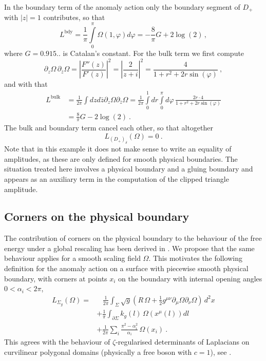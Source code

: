 \documentclass[11pt,a4paper]{article}
\numberwithin{equation}{section}
\begin{document}
In the boundary term of the anomaly action only the boundary segment of $D_+$ with $|z| = 1$ contributes, so that 
%
\begin{equation}
    L^\text{bdy} = \frac{1}{\pi}\int\limits_0^\pi \Omega(1,\varphi) d\varphi
    = 
    -\frac8\pi G + 2\log(2)\,,
\end{equation}
%
where $G=0.915..$ is Catalan's constant. 
For the bulk term we first compute
\begin{equation}
\partial_z \Omega\, \partial_{\bar z} \Omega
= \left| \frac{F''(z)}{F'(z)} \right|^2
= \left| \frac{2}{z+i} \right|^2=\frac{4}{1+r^2+2r\sin(\varphi)} \ ,
\end{equation}
and with that
\begin{align}
L^\text{bulk} &= \frac{1}{2\pi}
    \int dzd\bar{z} \partial_z \Omega \partial_{\bar z} \Omega = \frac{1}{2\pi}\int\limits_0^1 dr \int\limits_0^\pi d\varphi \,\frac{2r \cdot 4}{1+r^2+2r\sin(\varphi)} 
    \nonumber
    \\
    &= \frac{8}{\pi} G -2 \log(2)\ . 
\end{align}
The bulk and boundary term cancel each other, so that altogether
\begin{equation}
 L_{(D_+)_\delta}(\Omega)=0 \ .  
\end{equation}
Note that in this example it does not make sense to write an equality of amplitudes, as these are only defined for smooth physical boundaries. The situation treated here involves a physical boundary and a gluing boundary and  appears as an auxiliary term in the computation of the clipped triangle amplitude. 

\subsection{Corners on the physical boundary} \label{app:nonSmoothBdy}

The contribution of corners on the physical boundary to the behaviour of the free energy under a global rescaling has been derived in \cite[Eqn.\,(4.4)]{Cardy:1988tk}. We propose that the same behaviour applies for a smooth scaling field $\Omega$. This motivates the following definition for the anomaly action on a surface with piecewise smooth physical boundary, with corners at points $x_i$ on the boundary with internal opening angles $0<\alpha_i<2\pi$,
%
\begin{align}
    L_{\Sigma_g}(\Omega) = &~~~\,\frac{1}{2\pi} \int_\Sigma \sqrt{g} \left( R\, \Omega + \frac{1}{2}g^{\mu\nu}\partial_\mu\Omega \partial_\nu \Omega \right)\,d^2x
    \nonumber
    \\
    &+ \frac{1}{\pi} \int_{\partial\Sigma} k_g(l)\, \Omega\!\left(x^\mu(l)\right) dl 
    \nonumber
    \\
    &+ \frac1{2\pi}  \sum_i \frac{\pi^2-\alpha_i^2}{\alpha_i} \, \Omega(x_i) \ .
    \label{eq:anomaly-with-corner}
\end{align}
This agrees with the behaviour of $\zeta$-regularised determinants of Laplacians on curvilinear polygonal domains (physically a free boson with $c=1$), see \cite[Thm.\,1.6]{Aldana:2010}.
\end{document}
